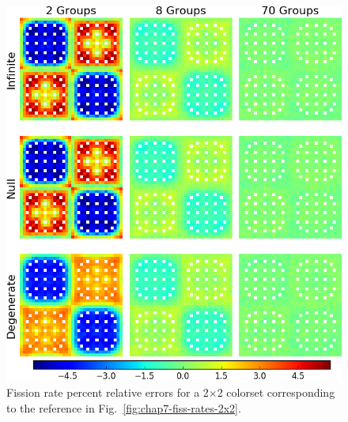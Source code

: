 \begin{appendices}
\begin{figure}[h!]
\centering
\includegraphics[width=\linewidth]{figures/quantification/appendix/2x2/fiss-err}
\vspace{2mm}
\caption[Fission rate errors for a 2$\times$2 colorset]{Fission rate percent relative errors for a 2$\times$2 colorset corresponding to the reference in Fig.~\ref{fig:chap7-fiss-rates-2x2}.}
\label{fig:quantify-2x2-fiss-err}
\end{figure}

\clearpage


\end{appendices}

